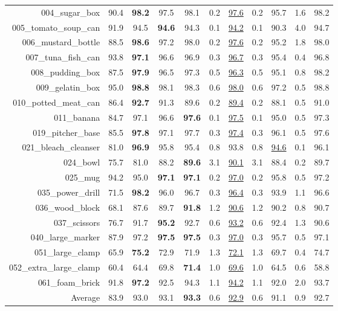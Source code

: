 \documentclass[runningheads]{llncs}
\begin{document}
\begin{table}[thpb]
{\begin{tabular}{r|c|c|c|cc||cc|cc||c}
004\_sugar\_box & 90.4 & \textbf{98.2} & 97.5 & 98.1 & 0.2 & \underline{97.6} & 0.2 & 95.7 & 1.6 & 98.2 \\
005\_tomato\_soup\_can & 91.9 & 94.5 & \textbf{94.6} & 94.3 & 0.1 & \underline{94.2} & 0.1 & 90.3 & 4.0 & 94.7 \\
006\_mustard\_bottle & 88.5 & \textbf{98.6} & 97.2 & 98.0 & 0.2 & \underline{97.6} & 0.2 & 95.2 & 1.8 & 98.0 \\
007\_tuna\_fish\_can & 93.8 & \textbf{97.1} & 96.6 & 96.9 & 0.3 & \underline{96.7} & 0.3 & 95.4 & 0.4 & 96.8 \\
008\_pudding\_box & 87.5 & \textbf{97.9} & 96.5 & 97.3 & 0.5 & \underline{96.3} & 0.5 & 95.1 & 0.8 & 98.2 \\
009\_gelatin\_box & 95.0 & \textbf{98.8} & 98.1 & 98.3 & 0.6 & \underline{98.0} & 0.6 & 97.2 & 0.5 & 98.8 \\
010\_potted\_meat\_can & 86.4 & \textbf{92.7} & 91.3 & 89.6 & 0.2 & \underline{89.4} & 0.2 & 88.1 & 0.5 & 91.0 \\
011\_banana & 84.7 & 97.1 & 96.6 & \textbf{97.6} & 0.1 & \underline{97.5} & 0.1 & 95.0 & 0.5 & 97.3 \\
019\_pitcher\_base & 85.5 & \textbf{97.8} & 97.1 & 97.7 & 0.3 & \underline{97.4} & 0.3 & 96.1 & 0.5 & 97.6 \\
021\_bleach\_cleanser & 81.0 & \textbf{96.9} & 95.8 & 95.4 & 0.8 & 93.8 & 0.8 & \underline{94.6} & 0.1 & 96.1 \\
024\_bowl & 75.7 & 81.0 & 88.2 & \textbf{89.6} & 3.1 & \underline{90.1} & 3.1 & 88.4 & 0.2 & 89.7 \\
025\_mug & 94.2 & 95.0 & \textbf{97.1} & \textbf{97.1} & 0.2 & \underline{97.0} & 0.2 & 95.8 & 0.5 & 97.2 \\
035\_power\_drill & 71.5 & \textbf{98.2} & 96.0 & 96.7 & 0.3 & \underline{96.4} & 0.3 & 93.9 & 1.1 & 96.6 \\
036\_wood\_block & 68.1 & 87.6 & 89.7 & \textbf{91.8} & 1.2 & \underline{90.6} & 1.2 & 90.2 & 0.8 & 90.7 \\
037\_scissors & 76.7 & 91.7 & \textbf{95.2} & 92.7 & 0.6 & \underline{93.2} & 0.6 & 92.4 & 1.3 & 90.6 \\
040\_large\_marker & 87.9 & 97.2 & \textbf{97.5} & \textbf{97.5} & 0.3 & \underline{97.0} & 0.3 & 95.7 & 0.5 & 97.1 \\
051\_large\_clamp & 65.9 & \textbf{75.2} & 72.9 & 71.9 & 1.3 & \underline{72.1} & 1.3 & 69.7 & 0.4 & 74.7 \\
052\_extra\_large\_clamp & 60.4 & 64.4 & 69.8 & \textbf{71.4} & 1.0 & \underline{69.6} & 1.0 & 64.5 & 0.6 & 58.8 \\
061\_foam\_brick & 91.8 & \textbf{97.2} & 92.5 & 94.3 & 1.1 & \underline{94.2} & 1.1 & 92.0 & 2.0 & 93.7 \\ \hline 
Average & 83.9 & 93.0 & 93.1 & \textbf{93.3} & 0.6 & \underline{92.9} & 0.6 & 91.1 & 0.9 & 92.7
\end{tabular}}
\end{table}
\end{document}
